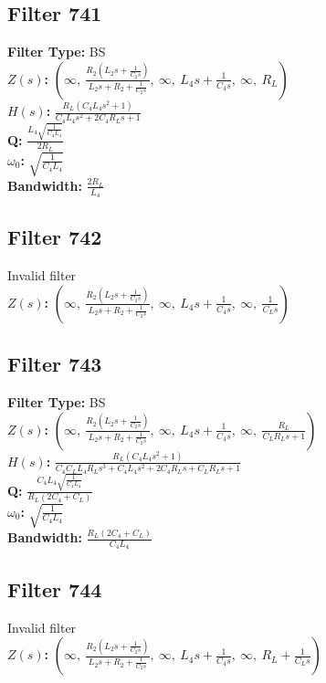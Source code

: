 \documentclass{article}
\begin{document}
\subsection*{Filter 741}
\textbf{Filter Type:} BS \\ 
\textbf{$Z(s)$:} $\left( \infty, \  \frac{R_{2} \left(L_{2} s + \frac{1}{C_{2} s}\right)}{L_{2} s + R_{2} + \frac{1}{C_{2} s}}, \  \infty, \  L_{4} s + \frac{1}{C_{4} s}, \  \infty, \  R_{L}\right)$ \\ 
\textbf{$H(s)$:} $\frac{R_{L} \left(C_{4} L_{4} s^{2} + 1\right)}{C_{4} L_{4} s^{2} + 2 C_{4} R_{L} s + 1}$ \\ 
\textbf{Q:} $\frac{L_{4} \sqrt{\frac{1}{C_{4} L_{4}}}}{2 R_{L}}$ \\ 
\textbf{$\omega_0$:} $\sqrt{\frac{1}{C_{4} L_{4}}}$ \\ 
\textbf{Bandwidth:} $\frac{2 R_{L}}{L_{4}}$ \\ 
\subsection*{Filter 742}
Invalid filter \\ 
\textbf{$Z(s)$:} $\left( \infty, \  \frac{R_{2} \left(L_{2} s + \frac{1}{C_{2} s}\right)}{L_{2} s + R_{2} + \frac{1}{C_{2} s}}, \  \infty, \  L_{4} s + \frac{1}{C_{4} s}, \  \infty, \  \frac{1}{C_{L} s}\right)$ \\ 
\subsection*{Filter 743}
\textbf{Filter Type:} BS \\ 
\textbf{$Z(s)$:} $\left( \infty, \  \frac{R_{2} \left(L_{2} s + \frac{1}{C_{2} s}\right)}{L_{2} s + R_{2} + \frac{1}{C_{2} s}}, \  \infty, \  L_{4} s + \frac{1}{C_{4} s}, \  \infty, \  \frac{R_{L}}{C_{L} R_{L} s + 1}\right)$ \\ 
\textbf{$H(s)$:} $\frac{R_{L} \left(C_{4} L_{4} s^{2} + 1\right)}{C_{4} C_{L} L_{4} R_{L} s^{3} + C_{4} L_{4} s^{2} + 2 C_{4} R_{L} s + C_{L} R_{L} s + 1}$ \\ 
\textbf{Q:} $\frac{C_{4} L_{4} \sqrt{\frac{1}{C_{4} L_{4}}}}{R_{L} \left(2 C_{4} + C_{L}\right)}$ \\ 
\textbf{$\omega_0$:} $\sqrt{\frac{1}{C_{4} L_{4}}}$ \\ 
\textbf{Bandwidth:} $\frac{R_{L} \left(2 C_{4} + C_{L}\right)}{C_{4} L_{4}}$ \\ 
\subsection*{Filter 744}
Invalid filter \\ 
\textbf{$Z(s)$:} $\left( \infty, \  \frac{R_{2} \left(L_{2} s + \frac{1}{C_{2} s}\right)}{L_{2} s + R_{2} + \frac{1}{C_{2} s}}, \  \infty, \  L_{4} s + \frac{1}{C_{4} s}, \  \infty, \  R_{L} + \frac{1}{C_{L} s}\right)$ \\ 
\end{document}
